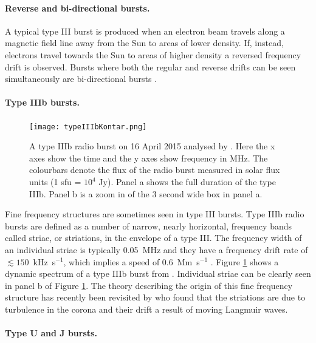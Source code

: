\paragraph{Reverse and bi-directional bursts.}

A typical type III burst is produced when an electron beam travels along a magnetic field line away from the Sun to areas of lower density. If, instead, electrons travel towards the Sun to areas of higher density a reversed frequency drift is observed. Bursts where both the regular and reverse drifts can be seen simultaneously are bi-directional bursts \citep{Reid2014}.

\paragraph{Type IIIb bursts.}

\begin{figure}
\centering
\texttt{[image: typeIIIbKontar.png]}
\caption[The type IIIb radio burst from \cite{Kontar2017}.]{A type IIIb radio burst on 16 April 2015 analysed by \cite{Kontar2017}. Here the x axes show the time and the y axes show frequency in MHz. The colourbars denote the flux of the radio burst measured in solar flux units (1 sfu = $10^4$ Jy). Panel a shows the full duration of the type IIIb. Panel b is a zoom in of the 3 second wide box in panel a.}
\label{fig:typeIIIbKontar}
\end{figure}

Fine frequency structures are sometimes seen in type III bursts. Type IIIb radio bursts are defined as a number of narrow, nearly horizontal, frequency bands called striae, or striations, in the envelope of a type III. The frequency width of an individual striae is typically 0.05~MHz \citep{McLean1985} and they have a frequency drift rate of $\lesssim 150$~kHz~s$^{-1}$, which implies a speed of 0.6~Mm~s$^{-1}$ \cite{Sharykin2018}. Figure \ref{fig:typeIIIbKontar} shows a dynamic spectrum of a type IIIb burst from \cite{Kontar2017}. Individual striae can be clearly seen in panel b of Figure \ref{fig:typeIIIbKontar}. The theory describing the origin of this fine frequency structure has recently been revisited by \cite{Reid2021} who found that the striations are due to turbulence in the corona and their drift a result of moving Langmuir waves.

\paragraph{Type U and J bursts.}

